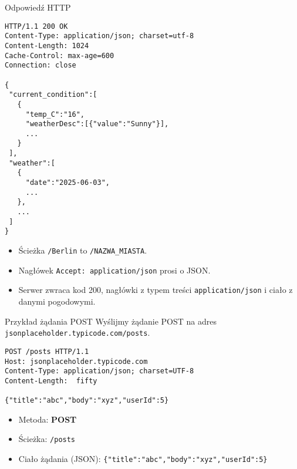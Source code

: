 \documentclass[10pt,compress,usenames,dvipsnames,aspectratio=169]{beamer}
\begin{document}
\begin{frame}[fragile]{Odpowiedź HTTP}
  \begin{lstlisting}[style=dark, basicstyle=\ttfamily\scriptsize\color{fgcode}, numbers=none, xleftmargin=1em, xrightmargin=1em]
HTTP/1.1 200 OK
Content-Type: application/json; charset=utf-8
Content-Length: 1024
Cache-Control: max-age=600
Connection: close

{
 "current_condition":[
   {
     "temp_C":"16",
     "weatherDesc":[{"value":"Sunny"}],
     ...
   }
 ],
 "weather":[
   {
     "date":"2025-06-03",
     ...
   },
   ...
 ]
}
  \end{lstlisting}

  \vspace{1ex}
  \begin{itemize}
    \item Ścieżka \texttt{/Berlin} to \texttt{/NAZWA\_MIASTA}.
    \item Nagłówek \texttt{Accept: application/json} prosi o JSON.
    \item Serwer zwraca kod 200, nagłówki z typem treści \texttt{application/json} i ciało z danymi pogodowymi.
  \end{itemize}
\end{frame}

\begin{frame}[fragile]{Przykład żądania POST}
Wyślijmy żądanie POST na adres  \texttt{jsonplaceholder.typicode.com/posts}.
  \begin{center}
    \begin{minipage}{0.5\textwidth}
      \begin{lstlisting}[style=dark, basicstyle=\ttfamily\scriptsize\color{fgcode}, numbers=none, xleftmargin=1em, xrightmargin=1em]
POST /posts HTTP/1.1
Host: jsonplaceholder.typicode.com
Content-Type: application/json; charset=UTF-8
Content-Length:  fifty

{"title":"abc","body":"xyz","userId":5}
      \end{lstlisting}
    \end{minipage}
  \end{center}

  \vspace{1ex}
  \begin{itemize}
    \item Metoda: \textbf{POST}
    \item Ścieżka: \texttt{/posts}
    \item Ciało żądania (JSON): \texttt{\{"title":"abc","body":"xyz","userId":5\}}
  \end{itemize}
\end{frame}
\end{document}
